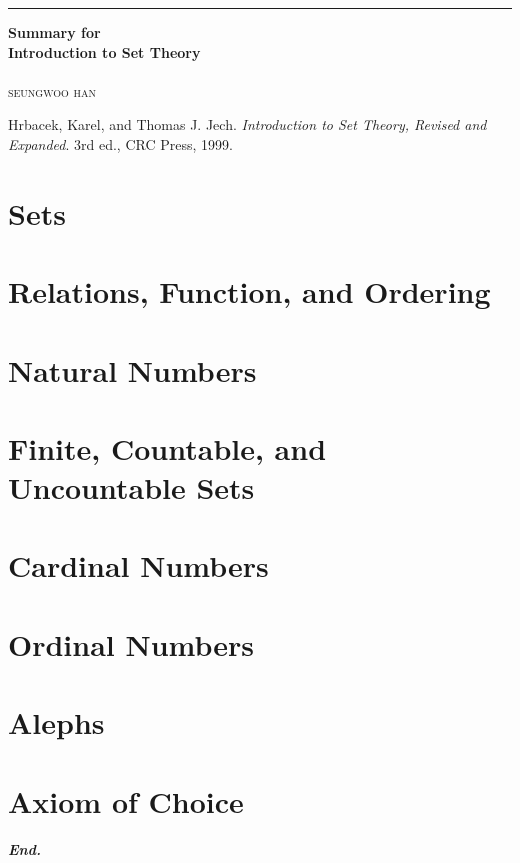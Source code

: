 \documentclass[a4paper,12pt]{report}
\begin{document}
\begin{titlepage}
	\raggedleft

	\rule{1pt}{\textheight}
	\hspace{0.05\textwidth}
	\parbox[b]{0.75\textwidth}{

		{\Huge\bfseries Summary for\\[0.5\baselineskip] Introduction to Set Theory}\\[2\baselineskip]
		\\[4\baselineskip]
		{\Large\textsc{seungwoo han}}

		\vspace{0.5\textheight} %

        {\noindent
        Hrbacek, Karel, and Thomas J. Jech.
        \textit{Introduction to Set Theory, Revised and Expanded}. 3rd ed.,
        CRC Press, 1999.}\\[\baselineskip]
	}
\end{titlepage}
\tikzexternaldisable
\tableofcontents
\tikzexternalenable
\hypersetup{
    colorlinks=true,
    linkcolor=red!50!black,
    filecolor=black,
    urlcolor=red!50!black,
}
\pagebreak

\chapter{Sets}\label{chap:sets}

\chapter{Relations, Function, and Ordering}\label{chap:relFuncOrder}



\chapter{Natural Numbers}\label{chap:nat}




\chapter{Finite, Countable, and Uncountable Sets}\label{chap:finite}





\chapter{Cardinal Numbers}\label{chap:cardinal}
\chapter{Ordinal Numbers}\label{chap:ordinal}
\chapter{Alephs}\label{chap:aleph}
\chapter{Axiom of Choice}\label{chap:aoc}

\vfill
\begin{center}
    \textbf{\textit{End.}}
\end{center}
\end{document}
